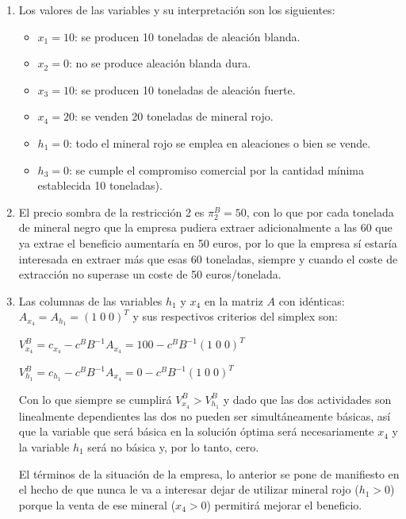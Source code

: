 \begin{enumerate}


\item Los valores de las variables y su interpretación son los siguientes:
\begin{itemize}
    \item $x_1 = 10$: se producen 10 toneladas de aleación blanda. 
    \item $x_2 = 0$: no se produce aleación blanda dura.
    \item $x_3 = 10$: se producen 10 toneladas de aleación fuerte.
    \item $x_4 = 20$: se venden 20 toneladas de mineral rojo.
    \item $h_1 = 0$: todo el mineral rojo se emplea en aleaciones o bien se vende.
    \item $h_3 = 0$: se cumple el compromiso comercial por la cantidad mínima establecida 10 toneladas).
\end{itemize}

\item El precio sombra de la restricción 2 es $\pi^B_2 = 50$, con lo que por cada tonelada de mineral negro que la empresa pudiera extraer adicionalmente a las 60 que ya extrae el beneficio aumentaría en 50 euros, por lo que la empresa sí estaría interesada en extraer más que esas 60 toneladas, siempre y cuando el coste de extracción no superase un coste de 50 euros/tonelada.

\item Las columnas de las variables $h_1$ y $x_4$ en la matriz $A$ con idénticas: $A_{x_4} = A_{h_1} = (1\; 0\; 0)^T$ y sus respectivos criterios del simplex son:


$V^B_{x_4} = c_{x_4} - c^BB^{-1}A_{x_4} = 100 - c^BB^{-1}(1\; 0\; 0)^T$

$V^B_{h_1} = c_{h_1} - c^BB^{-1}A_{x_4} = 0 - c^BB^{-1}(1\; 0\; 0)^T$

Con lo que siempre se cumplirá $V^B_{x_4} > V^B_{h_1}$ y dado que las dos actividades son linealmente dependientes las dos no pueden ser simultáneamente básicas, así que la variable que será básica en la solución óptima será necesariamente $x_4$ y la variable $h_1$ será no básica y, por lo tanto, cero.

El términos de la situación de la empresa, lo anterior se pone de manifiesto en el hecho de que nunca le va a interesar dejar de utilizar mineral rojo ($h_1 > 0 $) porque la venta de ese mineral ($x_4 > 0$) permitirá mejorar el beneficio.


\end{enumerate}
